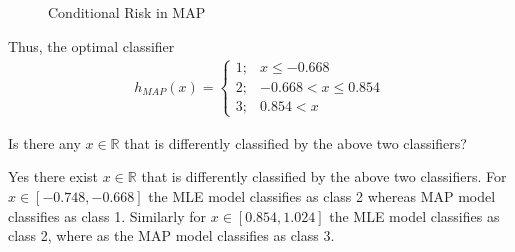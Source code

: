 \documentclass[solution,addpoints,12pt]{exam}
\begin{document}
\begin{questions}
\begin{parts}
\begin{subparts}
\begin{solution}
\begin{figure}[H]
		\centering
		\caption{Conditional Risk in MAP}
		\label{fig:Risk_MAP}
	\end{figure}
	Thus, the optimal classifier 
	\begin{align*}
		h_{MAP} (x) = \left\{ \begin{array}{ll}
			1;& x\leq-0.668\\
			2;&-0.668<x\leq0.854\\
			3;& 0.854<x
		\end{array}
		\right.
	\end{align*}
\end{solution}

\subpart[1] Is there any $x \in \mathbb{R}$ that is differently classified by the above two classifiers? 
\begin{solution}
	Yes there exist $x\in\mathbb{R}$ that is differently classified by the above two classifiers.
	For $x\in[-0.748,-0.668]$ the MLE model classifies as class 2 whereas MAP model classifies as class 1. Similarly for $x\in[0.854,1.024]$ the MLE model classifies as class 2, where as the MAP model classifies as class 3.
\end{solution}
\end{subparts}


\end{parts}
\end{questions}
\end{document}
